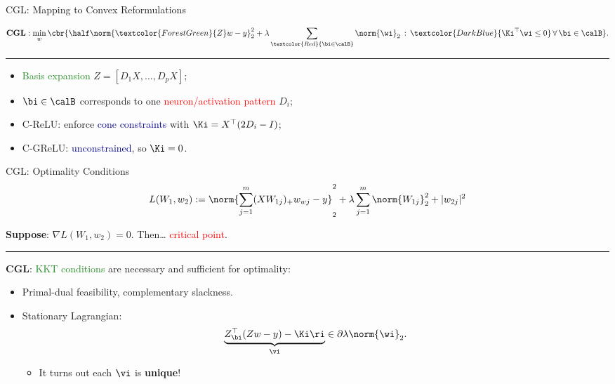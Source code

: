 \documentclass[usenames,dvipsnames,mathserif,notheorems]{beamer}
\newcommand{\horizontalrule}{
	{
			\vspace{-0.5em}
			\center \rule{\textwidth}{0.1em}
			\vspace{-0.2em}
		}
}
\newcommand{\red}[1]{\textcolor{Red}{#1}}
\newcommand{\green}[1]{\textcolor{ForestGreen}{#1}}
\newcommand{\blue}[1]{\textcolor{DarkBlue}{#1}}
\begin{document}
\begin{frame}{CGL: Mapping to Convex Reformulations}

	\begin{equation*}
		\textbf{CGL}: \min_{w}
		\cbr{ \half \norm{\green{Z} w - y}_2^2
			+ \lambda \sum_{\red{\bi \in \calB}} \norm{\wi}_2
			\, : \, \blue{\Ki^\top \wi \leq 0} \, \forall \, \bi \in \calB}.
	\end{equation*}

	\vspace{3ex}

	\pause
	\horizontalrule

	\begin{itemize}
		\item \green{Basis expansion} \( Z = [D_1 X, \ldots, D_p X] \);
		      \pause
		      \vspace{1ex}
		\item \( \bi \in \calB \) corresponds to one \red{neuron/activation pattern} \( D_i \);
		      \pause
		      \vspace{1ex}
		\item C-ReLU: enforce \blue{cone constraints} with \( \Ki = X^\top (2 D_i - I) \);
		      \pause
		      \vspace{1ex}
		\item C-GReLU: \blue{unconstrained}, so \( \Ki = 0 \).
	\end{itemize}

\end{frame}

\begin{frame}{CGL: Optimality Conditions}
	\[
		L(W_1, w_2) := \norm{\sum_{j=1}^m (X W_{1j})_+ w_{wj} - y}_2^2
		+ \lambda \sum_{j=1}^m \norm{W_{1j}}_2^2 + |w_{2j}|^2
	\]

	\pause

	\textbf{Suppose}: \( \nabla L(W_1, w_2) = 0 \). Then\ldots
	\pause \red{critical point}.

	\pause
	\horizontalrule

	\textbf{CGL}: \green{KKT conditions} are necessary and sufficient for optimality:\pause

	\vspace{1ex}
	\begin{itemize}
		\item Primal-dual feasibility, complementary slackness.
		      \pause
		      \vspace{1ex}
		\item Stationary Lagrangian:
		      \[
			      \underbrace{Z_\bi^\top (Z w - y) - \Ki \ri}_{\vi} \in \partial \lambda \norm{\wi}_2.
		      \]
		      \pause
		      \begin{itemize}
			      \normalsize
			      \item It turns out each \( \vi \) is \textbf{unique}!
		      \end{itemize}
	\end{itemize}

\end{frame}
\end{document}
